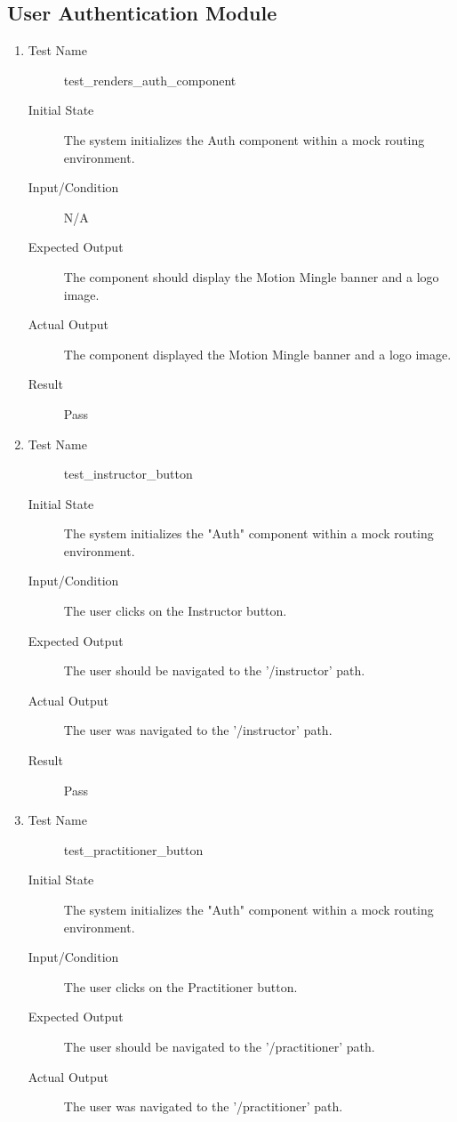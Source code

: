 \documentclass[12pt, titlepage]{article}
\begin{document}
\subsection{User Authentication Module}
\begin{enumerate}[UT-UA1]
\item \label{UT-UA1}
  \begin{description}
  \item[Test Name] test\_renders\_auth\_component
  \item[Initial State] The system initializes the Auth component within a mock
    routing environment.
  \item[Input/Condition] N/A
  \item[Expected Output] The component should display the Motion Mingle banner
    and a logo image.
  \item[Actual Output] The component displayed the Motion Mingle banner and a
    logo image.
  \item[Result] Pass
  \end{description}
\item \label{UT-UA2}
  \begin{description}
  \item[Test Name] test\_instructor\_button
  \item[Initial State] The system initializes the "Auth" component within a mock
    routing environment.
  \item[Input/Condition] The user clicks on the Instructor button.
  \item[Expected Output] The user should be navigated to the '/instructor' path.
  \item[Actual Output] The user was navigated to the '/instructor' path.
  \item[Result] Pass
  \end{description}
\item \label{UT-UA3}
  \begin{description}
  \item[Test Name] test\_practitioner\_button
  \item[Initial State] The system initializes the "Auth" component within a mock
    routing environment.
  \item[Input/Condition] The user clicks on the Practitioner button.
  \item[Expected Output] The user should be navigated to the '/practitioner'
    path.
  \item[Actual Output] The user was navigated to the '/practitioner' path.

\end{description}
\end{enumerate}
\end{document}
